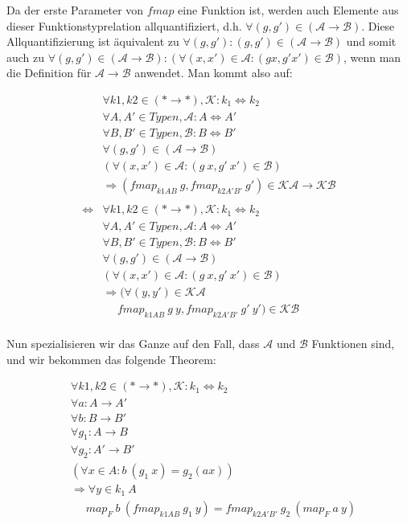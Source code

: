 Da der erste Parameter von $fmap$ eine Funktion ist, werden auch Elemente aus dieser Funktionstyprelation allquantifiziert, d.h.
$\forall (g, g') \in (\mathcal{A} \rightarrow \mathcal{B})$. Diese Allquantifizierung ist äquivalent zu
$\forall (g, g'): (g, g') \in (\mathcal{A} \rightarrow \mathcal{B})$ und somit auch zu $\forall (g, g') \in
(\mathcal{A} \rightarrow \mathcal{B}): (\forall (x, x') \in \mathcal{A}: (g x, g' x') \in \mathcal{B})$, wenn man die Definition für
$\mathcal{A} \rightarrow \mathcal{B}$ anwendet. Man kommt also auf:

\begin{align*}
&\forall k1, k2 \in (* \rightarrow *), \mathcal{K} : k_1 \Leftrightarrow k_2 \\
&\forall A, A' \in Typen, \mathcal{A} : A \Leftrightarrow A' \\
&\forall B, B' \in Typen, \mathcal{B} : B \Leftrightarrow B' \\
&\forall (g, g') \in (\mathcal{A} \rightarrow \mathcal{B}) \\
&(\forall (x, x') \in \mathcal{A}: (g\ x, g'\ x') \in \mathcal{B})\\
&\Rightarrow (fmap_{k1 A B}\ g, fmap_{k2 A' B'}\ g') \in \mathcal{K} \mathcal{A} \rightarrow \mathcal{K} \mathcal{B} \\
&\\
\Leftrightarrow &\forall k1, k2 \in (* \rightarrow *), \mathcal{K} : k_1 \Leftrightarrow k_2 \\
&\forall A, A' \in Typen, \mathcal{A} : A \Leftrightarrow A' \\
&\forall B, B' \in Typen, \mathcal{B} : B \Leftrightarrow B' \\
&\forall (g, g') \in (\mathcal{A} \rightarrow \mathcal{B}) \\
&(\forall (x, x') \in \mathcal{A}: (g\ x, g'\ x') \in \mathcal{B})\\
&\Rightarrow (\forall (y, y') \in \mathcal{K} \mathcal{A} \\
&\ \ \ \ \ \ fmap_{k1 A B}\ g\ y, fmap_{k2 A' B'}\ g'\ y') \in \mathcal{K} \mathcal{B}\\
\end{align*}

Nun spezialisieren wir das Ganze auf den Fall, dass $\mathcal{A}$ und $\mathcal{B}$ Funktionen sind, und wir bekommen das
folgende Theorem:

\begin{align*}
&\forall k1, k2 \in (* \rightarrow *), \mathcal{K} : k_1 \Leftrightarrow k_2 \\
&\forall a : A \rightarrow A' \\
&\forall b : B \rightarrow B' \\
&\forall g_1 : A \rightarrow B\\
&\forall g_2 : A' \rightarrow B' \\
&(\forall x \in A : b\ (g_1\ x) = g_2 (a x))\\
&\Rightarrow \forall y \in k_1\ A\\
&\ \ \ \ \ \ map_F\ b\ (fmap_{k1 A B}\ g_1\ y) = fmap_{k2 A' B'}\ g_2\ (map_F\ a\ y)
\end{align*}

